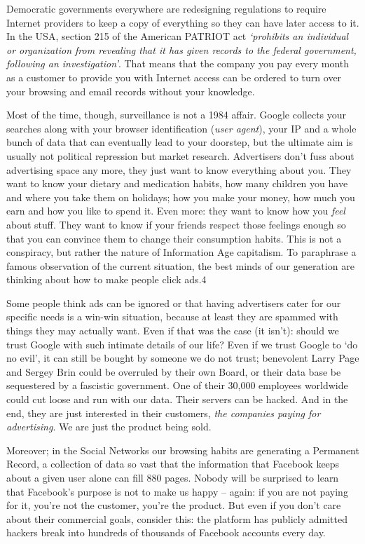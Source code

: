 Democratic governments everywhere are redesigning regulations to require
Internet providers to keep a copy of everything so they can have later
access to it. In the USA, section 215 of the American PATRIOT act
\emph{`prohibits an individual or organization from revealing that it
has given records to the federal government, following an
investigation'}. That means that the company you pay every month as a
customer to provide you with Internet access can be ordered to turn over
your browsing and email records without your knowledge.

Most of the time, though, surveillance is not a 1984 affair. Google
collects your searches along with your browser identification
(\emph{user agent}), your IP and a whole bunch of data that can
eventually lead to your doorstep, but the ultimate aim is usually not
political repression but market research. Advertisers don't fuss about
advertising space any more, they just want to know everything about you.
They want to know your dietary and medication habits, how many children
you have and where you take them on holidays; how you make your money,
how much you earn and how you like to spend it. Even more: they want to
know how you \emph{feel} about stuff. They want to know if your friends
respect those feelings enough so that you can convince them to change
their consumption habits. This is not a conspiracy, but rather the
nature of Information Age capitalism. To paraphrase a famous observation
of the current situation, the best minds of our generation are thinking
about how to make people click ads.4

Some people think ads can be ignored or that having advertisers cater
for our specific needs is a win-win situation, because at least they are
spammed with things they may actually want. Even if that was the case
(it isn't): should we trust Google with such intimate details of our
life? Even if we trust Google to `do no evil', it can still be bought by
someone we do not trust; benevolent Larry Page and Sergey Brin could be
overruled by their own Board, or their data base be sequestered by a
fascistic government. One of their 30,000 employees worldwide could cut
loose and run with our data. Their servers can be hacked. And in the
end, they are just interested in their customers, \emph{the companies
paying for advertising}. We are just the product being sold.

Moreover; in the Social Networks our browsing habits are generating a
Permanent Record, a collection of data so vast that the information that
Facebook keeps about a given user alone can fill 880 pages. Nobody will
be surprised to learn that Facebook's purpose is not to make us happy --
again: if you are not paying for it, you're not the customer, you're the
product. But even if you don't care about their commercial goals,
consider this: the platform has publicly admitted hackers break into
hundreds of thousands of Facebook accounts every day.

